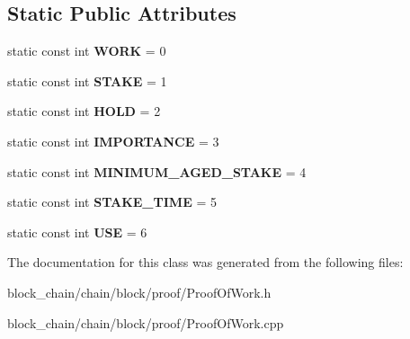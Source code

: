 \subsection*{Static Public Attributes}
\begin{DoxyCompactItemize}
\item 
\mbox{\label{classProof_a457d231986439ee6bcc945daacfc28fc}} 
static const int {\bfseries W\+O\+RK} = 0
\item 
\mbox{\label{classProof_acf157976c3c86ef2fd0e838b8c4ac992}} 
static const int {\bfseries S\+T\+A\+KE} = 1
\item 
\mbox{\label{classProof_ae5c2a86640bf558ff5625157e23b3eec}} 
static const int {\bfseries H\+O\+LD} = 2
\item 
\mbox{\label{classProof_a4e71a5e5928900794353acdd169ca652}} 
static const int {\bfseries I\+M\+P\+O\+R\+T\+A\+N\+CE} = 3
\item 
\mbox{\label{classProof_a1a08ffc465f4fcfde396d4c4feb22eb0}} 
static const int {\bfseries M\+I\+N\+I\+M\+U\+M\+\_\+\+A\+G\+E\+D\+\_\+\+S\+T\+A\+KE} = 4
\item 
\mbox{\label{classProof_a1aa2cb91c5be4ca021714ff6fc01da4a}} 
static const int {\bfseries S\+T\+A\+K\+E\+\_\+\+T\+I\+ME} = 5
\item 
\mbox{\label{classProof_a3f6898fa1d652d32182c3c387c8e979c}} 
static const int {\bfseries U\+SE} = 6
\end{DoxyCompactItemize}


The documentation for this class was generated from the following files\+:\begin{DoxyCompactItemize}
\item 
block\+\_\+chain/chain/block/proof/Proof\+Of\+Work.\+h\item 
block\+\_\+chain/chain/block/proof/Proof\+Of\+Work.\+cpp\end{DoxyCompactItemize}
